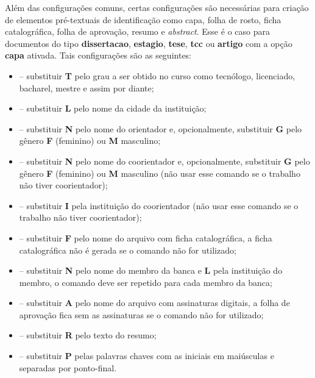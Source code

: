 \documentclass[artigo]{iftex2024}
\begin{document}
Além das configurações comuns, certas configurações são necessárias para criação de elementos pré-textuais de identificação como capa, folha de rosto, ficha catalográfica, folha de aprovação, resumo e \textit{abstract}.
Esse é o caso para documentos do tipo \textbf{dissertacao}, \textbf{estagio}, \textbf{tese}, \textbf{tcc} ou \textbf{artigo} com a opção \textbf{capa} ativada.
Tais configurações são as seguintes:
\begin{itemize}
  \item[]  -- substituir \textbf{T} pelo grau a ser obtido no curso como tecnólogo, licenciado, bacharel, mestre e assim por diante;

  \item[]  -- substituir \textbf{L} pelo nome da cidade da instituição;

  \item[]  -- substituir \textbf{N} pelo nome do orientador e, opcionalmente, substituir \textbf{G} pelo gênero \textbf{F} (feminino) ou \textbf{M} masculino;

  \item[]  -- substituir \textbf{N} pelo nome do coorientador e, opcionalmente, substituir \textbf{G} pelo gênero \textbf{F} (feminino) ou \textbf{M} masculino (não usar esse comando se o trabalho não tiver coorientador);

  \item[]  -- substituir \textbf{I} pela instituição do coorientador (não usar esse comando se o trabalho não tiver coorientador);

  \item[]  -- substituir \textbf{F} pelo nome do arquivo com ficha catalográfica, a ficha catalográfica não é gerada se o comando não for utilizado;

  \item[]  -- substituir \textbf{N} pelo nome do membro da banca e \textbf{L} pela instituição do membro, o comando deve ser repetido para cada membro da banca;

  \item[]  -- substituir \textbf{A} pelo nome do arquivo com assinaturas digitais, a folha de aprovação fica sem as assinaturas se o comando não for utilizado;

  \item[]  -- substituir \textbf{R} pelo texto do resumo;

  \item[]  -- substituir \textbf{P} pelas palavras chaves com as iniciais em maiúsculas e separadas por ponto-final.
\end{itemize}
\end{document}
